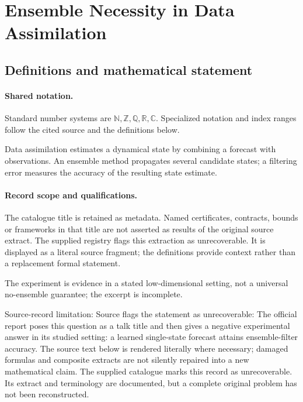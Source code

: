 \documentclass[11pt]{article}
\begin{document}
\section{Ensemble Necessity in Data Assimilation}\label{statement}

\subsection{Definitions and mathematical statement}

\paragraph{Shared notation.}Standard number systems are $\mathbb N,\mathbb Z,\mathbb Q,\mathbb R,\mathbb C$. Specialized notation and index ranges follow the cited source and the definitions below.


Data assimilation estimates a dynamical state by combining a forecast with observations. An ensemble method propagates several candidate states; a filtering error measures the accuracy of the resulting state estimate.
\paragraph{Record scope and qualifications.}
The catalogue title is retained as metadata. Named certificates, contracts, bounds or frameworks in that title are not asserted as results of the original source extract.
The supplied registry flags this extraction as unrecoverable. It is displayed as a literal source fragment; the definitions provide context rather than a replacement formal statement.

The experiment is evidence in a stated low-dimensional setting, not a universal no-ensemble guarantee; the excerpt is incomplete.

Source-record limitation: Source flags the statement as unrecoverable: The official report poses this question as a talk title and then gives a negative experimental answer in its studied setting: a learned single-state forecast attains ensemble-filter accuracy.
The source text below is rendered literally where necessary; damaged formulas and composite extracts are not silently repaired into a new mathematical claim.
The supplied catalogue marks this record as unrecoverable. Its extract and terminology are documented, but a complete original problem has not been reconstructed.
\end{document}
